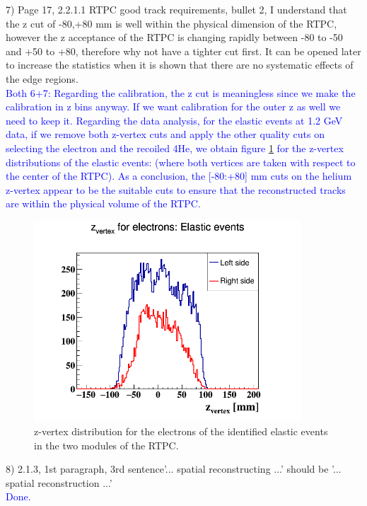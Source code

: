 7) Page 17, 2.2.1.1 RTPC good track requirements, bullet 2, I understand that 
the z cut of -80,+80 mm is well within the physical dimension of the RTPC,  
however the z  acceptance of the RTPC is changing rapidly between -80 to -50 
and +50 to +80, therefore why not have a  tighter cut first. It can be opened 
later to increase the statistics when it is shown that there are no systematic 
effects of the edge regions. \\
\textcolor{blue}{
 Both 6+7: Regarding the calibration, the z cut is meaningless since we make 
 the calibration in z bins anyway. If we want calibration for the outer z as 
 well we need to keep it. Regarding the data analysis, for the elastic events 
 at 1.2 GeV data, if we remove both z-vertex cuts and apply the other quality 
 cuts on selecting the electron and the recoiled 4He, we obtain figure 
 \ref{fig:elastic_z_vertex} for the z-vertex distributions of the elastic 
 events: (where both vertices are taken with respect to the center of the 
 RTPC).  As a conclusion, the [-80:+80] mm cuts on the helium z-vertex appear 
 to be the suitable cuts to ensure that the reconstructed tracks are within the 
 physical volume of the RTPC.}\\
\begin{figure}[tbp]
\centering
\includegraphics[height=7.5cm]{fig/elastic_z_vertex.png}
\caption{z-vertex distribution for the electrons of the identified elastic 
events in the two modules of the RTPC.}
\label{fig:elastic_z_vertex}
 \end{figure}

8) 2.1.3, 1st paragraph, 3rd sentence'... spatial reconstructing ...' should be 
'...  spatial reconstruction ...' \\
\textcolor{blue}{ Done.} \\

